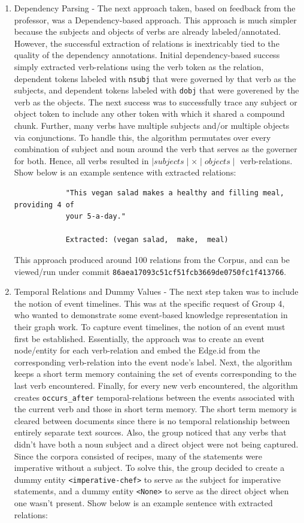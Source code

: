 \documentclass[11pt,letterpaper]{article}
\begin{document}
\begin{enumerate}
    \item Dependency Parsing - The next approach taken, based on feedback from the professor, was a Dependency-based approach.  This approach is much simpler because the subjects and objects of verbs are already labeled/annotated.  However, the successful extraction of relations is inextricably tied to the quality of the dependency annotations.  Initial dependency-based success simply extracted verb-relations using the verb token as the relation, dependent tokens labeled with \texttt{nsubj} that were governed by that verb as the subjects, and dependent tokens labeled with \texttt{dobj} that were goverened by the verb as the objects.  The next success was to successfully trace any subject or object token to include any other token with which it shared a compound chunk.  Further, many verbs have multiple subjects and/or multiple objects via conjunctions.  To handle this, the algorithm permutates over every combination of subject and noun around the verb that serves as the governer for both.  Hence, all verbs resulted in $ \mid subjects \mid \times \mid objects \mid $ verb-relations.  Show below is an example sentence with extracted relations:
    
        \begin{verbatim}
            "This vegan salad makes a healthy and filling meal, providing 4 of
            your 5-a-day."
            
            Extracted: (vegan salad,  make,  meal)
        \end{verbatim}
        
    This approach produced around 100 relations from the Corpus, and can be viewed/run under commit \texttt{86aea17093c51cf51fcb3669de0750fc1f413766}.
    
    \item Temporal Relations and Dummy Values - The next step taken was to include the notion of event timelines.  This was at the specific request of Group 4, who wanted to demonstrate some event-based knowledge representation in their graph work.  To capture event timelines, the notion of an event must first be established.  Essentially, the approach was to create an event node/entity for each verb-relation and embed the Edge.id from the corresponding verb-relation into the event node's label.  Next, the algorithm keeps a short term memory containing the set of events corresponding to the last verb encountered. Finally, for every new verb encountered, the algorithm creates \texttt{occurs\_after} temporal-relations between the events associated with the current verb and those in short term memory.  The short term memory is cleared between documents since there is no temporal relationship between entirely separate text sources.  Also, the group noticed that any verbs that didn't have both a noun subject and a direct object were not being captured.  Since the corpora consisted of recipes, many of the statements were imperative without a subject.  To solve this, the group decided to create a dummy entity \texttt{<imperative-chef>} to serve as the subject for imperative statements, and a dummy entity \texttt{<None>} to serve as the direct object when one wasn't present.  Show below is an example sentence with extracted relations:
    

\end{enumerate}
\end{document}
